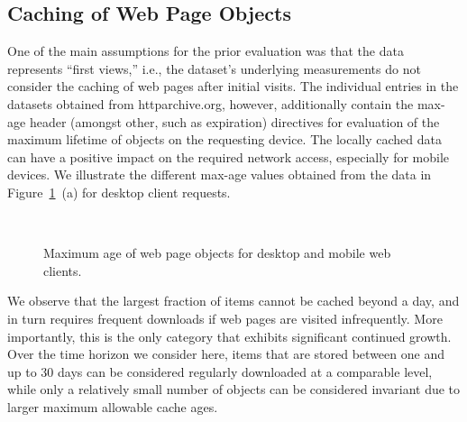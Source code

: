 \documentclass[journal,final]{IEEEtran}
\begin{document}
\subsection{Caching of Web Page Objects}
One of the main assumptions for the prior evaluation was that the data represents ``first views,'' i.e., the dataset's underlying measurements do not consider the caching of web pages after initial visits. 
The individual entries in the datasets obtained from httparchive.org, however, additionally contain the max-age header (amongst other, such as expiration) directives for evaluation of the maximum lifetime of objects on the requesting device. The locally cached data can have a positive impact on the required network access, especially for mobile devices.
We illustrate the different max-age values obtained from the data in Figure~\ref{fig:maxage}~(a) for desktop client requests.
\begin{figure}
	\centering
	\qquad
	\\
	\caption{Maximum age of web page objects for desktop and mobile web clients.\label{fig:maxage}}
\end{figure}
We observe that the largest fraction of items cannot be cached beyond a day, and in turn requires frequent downloads if web pages are visited infrequently. 
More importantly, this is the only category that exhibits significant continued growth.
Over the time horizon we consider here, items that are stored between one and up to 30 days can be considered regularly downloaded at a comparable level, while only a relatively small number of objects can be considered invariant due to larger maximum allowable cache ages.
\end{document}
